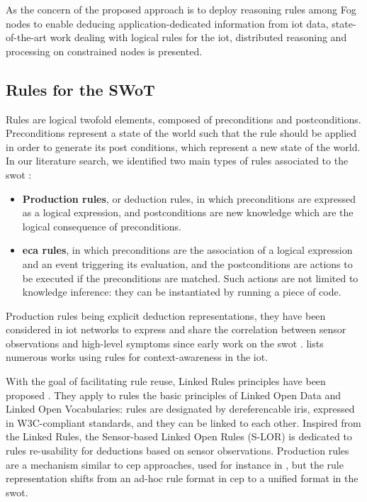 \documentclass{iosart2c}
\begin{document}
As the concern of the proposed approach is to deploy reasoning rules among Fog nodes to enable deducing application-dedicated information from \gls{iot} data, state-of-the-art work dealing with logical rules for the \gls{iot}, distributed reasoning and processing on constrained nodes is presented.

\subsection{Rules for the SWoT}
\label{subs:rules}

Rules are logical twofold elements, composed of preconditions and postconditions.
Preconditions represent a state of the world such that the rule should be applied in order to generate its post conditions, which represent a new state of the world.
In our literature search, we identified two main types of rules associated to the \gls{swot} \cite{Boley2007}:
\begin{itemize}
	\item \textbf{Production rules}, or deduction rules, in which preconditions are expressed as a logical expression, and postconditions are new knowledge which are the logical consequence of preconditions.
	\item \textbf{\gls{eca} rules}, in which preconditions are the association of a logical expression and an event triggering its evaluation, and the postconditions are actions to be executed if the preconditions are matched. 
	Such actions are not limited to knowledge inference: they can be instantiated by running a piece of code.
\end{itemize}

Production rules being explicit deduction representations, they have been considered in \gls{iot} networks to express and share the correlation between sensor observations and high-level symptoms since early work on the \gls{swot} \cite{AmitSheth30}.
\cite{Sezer2018} lists numerous works using rules for context-awareness in the \gls{iot}.

With the goal of facilitating rule reuse, Linked Rules principles have been proposed \cite{Khandelwal2011}. 
They apply to rules the basic principles of Linked Open Data and Linked Open Vocabularies: rules are designated by dereferencable \gls{iri}s, expressed in W3C-compliant standards, and they can be linked to each other.
Inspired from the Linked Rules, the Sensor-based Linked Open Rules (S-LOR)\cite{Gyrard2017} is dedicated to rules re-usability for deductions based on sensor observations.
Production rules are a mechanism similar to \gls{cep} approaches, used for instance in \cite{ZangLi55}, but the rule representation shifts from an ad-hoc rule format in \gls{cep} to a unified format in the \gls{swot}. 
\end{document}
